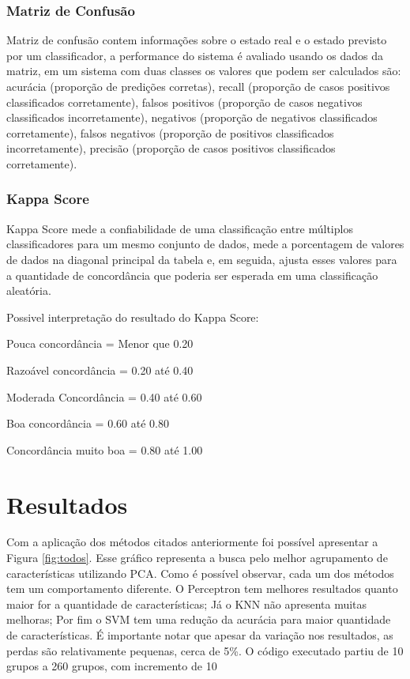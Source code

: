 \documentclass[12pt]{article}
\begin{document}
	\subsubsection{Matriz de Confusão}
	
		Matriz de confusão contem informações sobre o estado real e o estado previsto por um classificador, a performance do sistema é avaliado usando os dados da matriz, em um sistema com duas classes os valores que podem ser calculados são: acurácia (proporção de predições corretas), recall (proporção de casos positivos classificados corretamente), falsos positivos (proporção de casos negativos classificados incorretamente), negativos (proporção de negativos classificados corretamente), falsos negativos (proporção de positivos classificados incorretamente), precisão (proporção de casos positivos classificados corretamente).
		
	\subsubsection{Kappa Score}
	
	Kappa Score mede a confiabilidade de uma classificação entre múltiplos classificadores para um mesmo conjunto de dados, mede a porcentagem de valores de dados na diagonal principal da tabela e, em seguida, ajusta esses valores para a quantidade de concordância que poderia ser esperada em uma classificação aleatória.
	
	Possivel interpretação do resultado do Kappa Score:
	
	Pouca concordância = Menor que 0.20
	
	Razoável concordância = 0.20 até 0.40
	
	Moderada Concordância = 0.40 até 0.60
	
	Boa concordância = 0.60 até 0.80
	
	Concordância muito boa = 0.80 até 1.00	
		
\section{Resultados}
	Com a aplicação dos métodos citados anteriormente foi possível apresentar a Figura \ref{fig:todos}. Esse gráfico representa a busca pelo melhor agrupamento de características utilizando PCA. Como é possível observar, cada um dos métodos tem um comportamento diferente. O Perceptron tem melhores resultados quanto maior for a quantidade de características; Já o KNN não apresenta muitas melhoras; Por fim o SVM tem uma redução da acurácia para maior quantidade de características. É importante notar que apesar da variação nos resultados, as perdas são relativamente pequenas, cerca de 5\%. O código executado partiu de 10 grupos a 260 grupos, com incremento de 10
\end{document}
